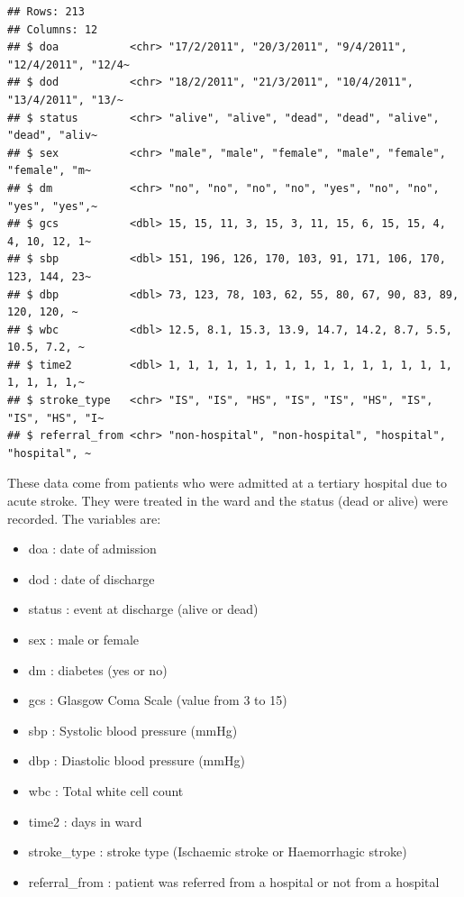 \documentclass[
  10pt,
]{krantz}
\providecommand{\tightlist}{%
  \setlength{\itemsep}{0pt}\setlength{\parskip}{0pt}}
\begin{document}
\begin{verbatim}
## Rows: 213
## Columns: 12
## $ doa           <chr> "17/2/2011", "20/3/2011", "9/4/2011", "12/4/2011", "12/4~
## $ dod           <chr> "18/2/2011", "21/3/2011", "10/4/2011", "13/4/2011", "13/~
## $ status        <chr> "alive", "alive", "dead", "dead", "alive", "dead", "aliv~
## $ sex           <chr> "male", "male", "female", "male", "female", "female", "m~
## $ dm            <chr> "no", "no", "no", "no", "yes", "no", "no", "yes", "yes",~
## $ gcs           <dbl> 15, 15, 11, 3, 15, 3, 11, 15, 6, 15, 15, 4, 4, 10, 12, 1~
## $ sbp           <dbl> 151, 196, 126, 170, 103, 91, 171, 106, 170, 123, 144, 23~
## $ dbp           <dbl> 73, 123, 78, 103, 62, 55, 80, 67, 90, 83, 89, 120, 120, ~
## $ wbc           <dbl> 12.5, 8.1, 15.3, 13.9, 14.7, 14.2, 8.7, 5.5, 10.5, 7.2, ~
## $ time2         <dbl> 1, 1, 1, 1, 1, 1, 1, 1, 1, 1, 1, 1, 1, 1, 1, 1, 1, 1, 1,~
## $ stroke_type   <chr> "IS", "IS", "HS", "IS", "IS", "HS", "IS", "IS", "HS", "I~
## $ referral_from <chr> "non-hospital", "non-hospital", "hospital", "hospital", ~
\end{verbatim}

These data come from patients who were admitted at a tertiary hospital due to acute stroke. They were treated in the ward and the status (dead or alive) were recorded. The variables are:

\begin{itemize}
\tightlist
\item
  doa : date of admission\\
\item
  dod : date of discharge
\item
  status : event at discharge (alive or dead)\\
\item
  sex : male or female\\
\item
  dm : diabetes (yes or no)\\
\item
  gcs : Glasgow Coma Scale (value from 3 to 15)\\
\item
  sbp : Systolic blood pressure (mmHg)\\
\item
  dbp : Diastolic blood pressure (mmHg)\\
\item
  wbc : Total white cell count\\
\item
  time2 : days in ward\\
\item
  stroke\_type : stroke type (Ischaemic stroke or Haemorrhagic stroke)\\
\item
  referral\_from : patient was referred from a hospital or not from a hospital
\end{itemize}
\end{document}
